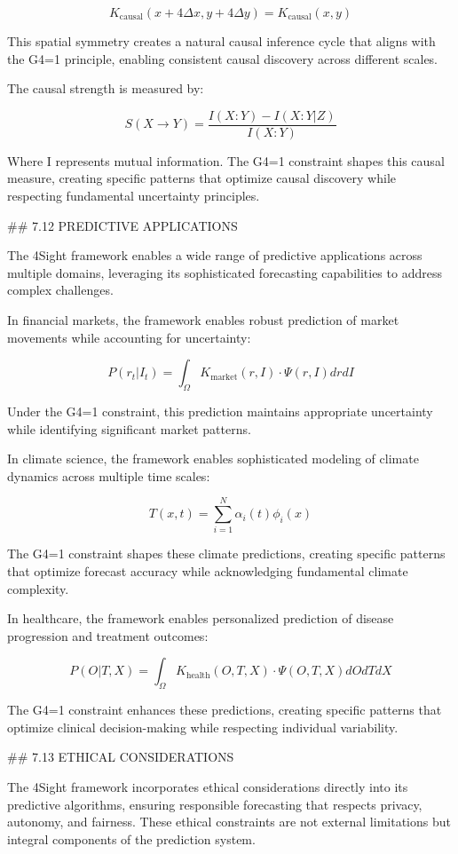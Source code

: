 $$K_{\text{causal}}(x+4\Delta x, y+4\Delta y) = K_{\text{causal}}(x, y)$$

This spatial symmetry creates a natural causal inference cycle that aligns with the G4=1 principle, enabling consistent causal discovery across different scales.

The causal strength is measured by:

$$S(X \rightarrow Y) = \frac{I(X:Y) - I(X:Y|Z)}{I(X:Y)}$$

Where I represents mutual information. The G4=1 constraint shapes this causal measure, creating specific patterns that optimize causal discovery while respecting fundamental uncertainty principles.

## 7.12 PREDICTIVE APPLICATIONS

The 4Sight framework enables a wide range of predictive applications across multiple domains, leveraging its sophisticated forecasting capabilities to address complex challenges.

In financial markets, the framework enables robust prediction of market movements while accounting for uncertainty:

$$P(r_t | I_t) = \int_{\Omega} K_{\text{market}}(r, I) \cdot \Psi(r, I) dr dI$$

Under the G4=1 constraint, this prediction maintains appropriate uncertainty while identifying significant market patterns.

In climate science, the framework enables sophisticated modeling of climate dynamics across multiple time scales:

$$T(x, t) = \sum_{i=1}^N \alpha_i(t) \phi_i(x)$$

The G4=1 constraint shapes these climate predictions, creating specific patterns that optimize forecast accuracy while acknowledging fundamental climate complexity.

In healthcare, the framework enables personalized prediction of disease progression and treatment outcomes:

$$P(O | T, X) = \int_{\Omega} K_{\text{health}}(O, T, X) \cdot \Psi(O, T, X) dO dT dX$$

The G4=1 constraint enhances these predictions, creating specific patterns that optimize clinical decision-making while respecting individual variability.

## 7.13 ETHICAL CONSIDERATIONS

The 4Sight framework incorporates ethical considerations directly into its predictive algorithms, ensuring responsible forecasting that respects privacy, autonomy, and fairness. These ethical constraints are not external limitations but integral components of the prediction system.

